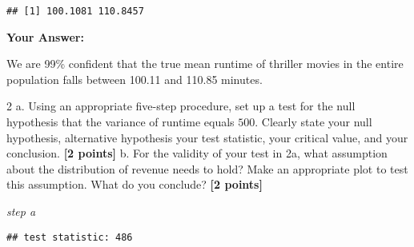 \documentclass[
]{article}
\newenvironment{Shaded}{\begin{snugshade}}{\end{snugshade}}
\newcommand{\AttributeTok}[1]{\textcolor[rgb]{0.13,0.29,0.53}{#1}}
\newcommand{\CommentTok}[1]{\textcolor[rgb]{0.56,0.35,0.01}{\textit{#1}}}
\newcommand{\ConstantTok}[1]{\textcolor[rgb]{0.56,0.35,0.01}{#1}}
\newcommand{\DecValTok}[1]{\textcolor[rgb]{0.00,0.00,0.81}{#1}}
\newcommand{\FunctionTok}[1]{\textcolor[rgb]{0.13,0.29,0.53}{\textbf{#1}}}
\newcommand{\NormalTok}[1]{#1}
\newcommand{\OtherTok}[1]{\textcolor[rgb]{0.56,0.35,0.01}{#1}}
\newcommand{\SpecialCharTok}[1]{\textcolor[rgb]{0.81,0.36,0.00}{\textbf{#1}}}
\newcommand{\StringTok}[1]{\textcolor[rgb]{0.31,0.60,0.02}{#1}}
\begin{document}
\begin{verbatim}
## [1] 100.1081 110.8457
\end{verbatim}

\textbf{Your Answer:}

We are 99\% confident that the true mean runtime of thriller movies in
the entire population falls between 100.11 and 110.85 minutes.

2 a. Using an appropriate five-step procedure, set up a test for the
null hypothesis that the variance of runtime equals \(500\). Clearly
state your null hypothesis, alternative hypothesis your test statistic,
your critical value, and your conclusion. \textbf{[2 points]} b. For the
validity of your test in 2a, what assumption about the distribution of
revenue needs to hold? Make an appropriate plot to test this assumption.
What do you conclude? \textbf{[2 points]}

\emph{step a}

\begin{Shaded}
\end{Shaded}

\begin{verbatim}
## test statistic: 486
\end{verbatim}
\end{document}
